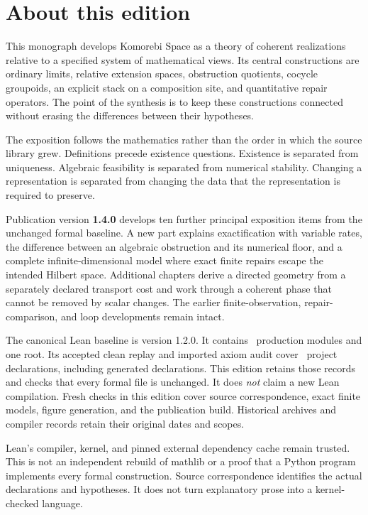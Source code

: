 \documentclass[11pt]{article}
\begin{document}
\KomorebiCover
{}
\section*{About this edition}
This monograph develops Komorebi Space as a theory of coherent realizations relative to a specified system of mathematical views. Its central constructions are ordinary limits, relative extension spaces, obstruction quotients, cocycle groupoids, an explicit stack on a composition site, and quantitative repair operators. The point of the synthesis is to keep these constructions connected without erasing the differences between their hypotheses.

The exposition follows the mathematics rather than the order in which the source library grew. Definitions precede existence questions. Existence is separated from uniqueness. Algebraic feasibility is separated from numerical stability. Changing a representation is separated from changing the data that the representation is required to preserve.

Publication version \textbf{1.4.0} develops ten further principal exposition items from the unchanged formal baseline. A new part explains exactification with variable rates, the difference between an algebraic obstruction and its numerical floor, and a complete infinite-dimensional model where exact finite repairs escape the intended Hilbert space. Additional chapters derive a directed geometry from a separately declared transport cost and work through a coherent phase that cannot be removed by scalar changes. The earlier finite-observation, repair-comparison, and loop developments remain intact.

The canonical Lean baseline is version 1.2.0. It contains \EditionFormalModules\ production modules and one root. Its accepted clean replay and imported axiom audit cover \EditionAuditedDeclarations\ project declarations, including generated declarations. This edition retains those records and checks that every formal file is unchanged. It does \emph{not} claim a new Lean compilation. Fresh checks in this edition cover source correspondence, exact finite models, figure generation, and the publication build. Historical archives and compiler records retain their original dates and scopes.

Lean's compiler, kernel, and pinned external dependency cache remain trusted. This is not an independent rebuild of mathlib or a proof that a Python program implements every formal construction. Source correspondence identifies the actual declarations and hypotheses. It does not turn explanatory prose into a kernel-checked language.
\end{document}
